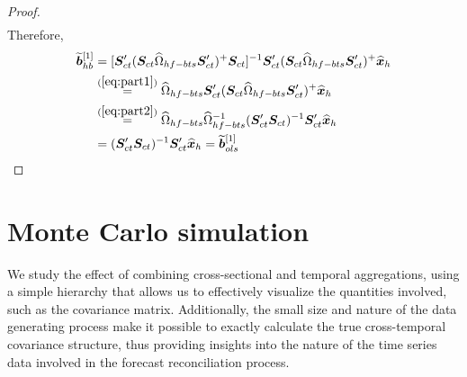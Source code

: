 \documentclass[a4paper,11pt]{article}
\newcommand{\bvet}{\bm{b}}
\newcommand{\xvet}{\bm{x}}
\newcommand{\Svet}{\bm{S}}
\theoremstyle{definition}
\begin{document}
{\begin{proof}
\begin{equation}
\begin{aligned}
\end{aligned}
\end{equation}
Therefore,
\begin{align*}
	\widetilde{\bvet}_{hb}^{[1]} &= [\Svet_{ct}'(\Svet_{ct}\widehat{\Omega}_{hf-bts}\Svet_{ct}')^{+}\Svet_{ct}]^{-1}\Svet_{ct}' (\Svet_{ct}\widehat{\Omega}_{hf-bts}\Svet_{ct}')^{+}\widehat{\xvet}_{h} \\ & \overset{(\ref{eq:part1})}{=} \widehat{\Omega}_{hf-bts}\Svet_{ct}' (\Svet_{ct}\widehat{\Omega}_{hf-bts}\Svet_{ct}')^{+}\widehat{\xvet}_{h}\\
	& \overset{(\ref{eq:part2})}{=} \widehat{\Omega}_{hf-bts}\widehat{\Omega}_{hf-bts}^{-1}(\Svet_{ct}'\Svet_{ct})^{-1}\Svet_{ct}' \widehat{\xvet}_{h} \\
	& = (\Svet_{ct}'\Svet_{ct})^{-1}\Svet_{ct}' \widehat{\xvet}_{h} = \widetilde{\bvet}_{ols}^{[1]} 
\end{align*}	
\end{proof}
}
\newpage
\section{Monte Carlo simulation}\label{sec:mcsim}

We study the effect of combining cross-sectional and temporal aggregations, using a simple hierarchy that allows us to effectively visualize the quantities involved, such as the covariance matrix. Additionally, the small size and nature of the data generating process make it possible to exactly calculate the true cross-temporal covariance structure, thus providing insights into the nature of the time series data involved in the forecast reconciliation process.
\end{document}
